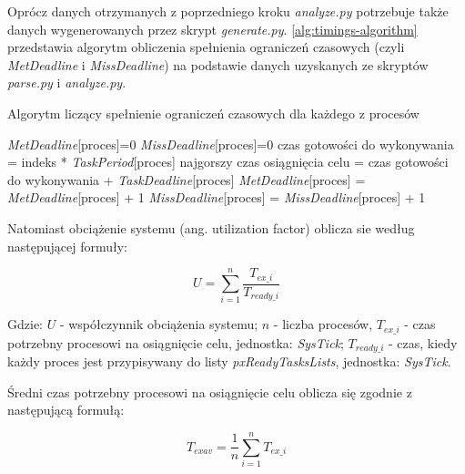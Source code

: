 \documentclass[../../main]{subfiles}
\begin{document}
Oprócz danych otrzymanych z poprzedniego kroku \textit{analyze.py} potrzebuje także danych wygenerowanych przez skrypt \textit{generate.py}. \cref{alg:timings-algorithm} przedstawia algorytm obliczenia spełnienia ograniczeń czasowych (czyli \textit{MetDeadline} i \textit{MissDeadline}) na podstawie danych uzyskanych ze skryptów \textit{parse.py} i \textit{analyze.py}.

\begin{algorithm}
\caption{Algorytm liczący spełnienie ograniczeń czasowych dla każdego z procesów}\label{alg:timings-algorithm}
\begin{algorithmic}[1]
  \State \textit{MetDeadline}[proces]=0
  \State \textit{MissDeadline}[proces]=0
    \State czas gotowości do wykonywania = indeks * \textit{TaskPeriod}[proces]
    \State najgorszy czas osiągnięcia celu = czas gotowości do wykonywania + \textit{TaskDeadline}[proces]
      \State \textit{MetDeadline}[proces] = \textit{MetDeadline}[proces] + 1
      \State \textit{MissDeadline}[proces] = \textit{MissDeadline}[proces] + 1
    \EndIf
  \EndFor
\EndFor
\end{algorithmic}
\end{algorithm}

Natomiast obciążenie systemu (ang. utilization factor) oblicza sie według następującej formuły:

\large
\begin{equation}
    U = \sum_{i=1}^{n} \frac{T_{ex\_i}}{T_{ready\_i}}
    \label{eq:utilization}
\end{equation}
\normalsize

Gdzie: $U$ - współczynnik obciążenia systemu; $n$ - liczba procesów, $T_{ex\_i}$ - czas potrzebny  procesowi na osiągnięcie celu, jednostka: \textit{SysTick}; $T_{ready\_i}$ - czas,
kiedy każdy proces jest przypisywany do listy \textit{pxReadyTasksLists}, jednostka: \textit{SysTick}.

Średni czas potrzebny procesowi na osiągnięcie celu oblicza się zgodnie z następującą formułą:

\large
\begin{equation}
    T_{exav}= \frac{1}{n}\sum_{i=1}^nT_{ex\_i}
    \label{eq:avarage-ex-time}
\end{equation}
\normalsize
\end{document}
